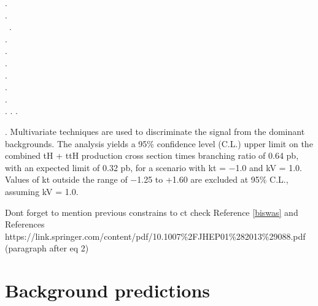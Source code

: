 .\\
.\\\
.\\
.\\
.\\
.\\
.\\
.\\
.\\
.
.
.
































. Multivariate techniques are used to discriminate the signal from the dominant backgrounds. The analysis yields a 95\% confidence level (C.L.) upper limit on the combined tH + ttH production cross section times branching ratio of 0.64 pb, with an expected limit of 0.32 pb, for a scenario with kt = −1.0 and kV = 1.0. Values of kt outside the range of −1.25 to +1.60 are excluded at 95\% C.L., assuming kV = 1.0.

Dont forget to mention previous constrains to ct check Reference \ref{biswas} and References https://link.springer.com/content/pdf/10.1007\%2FJHEP01\%282013\%29088.pdf (paragraph after eq 2)




























\section{Background predictions}
\label{secc:bg}

